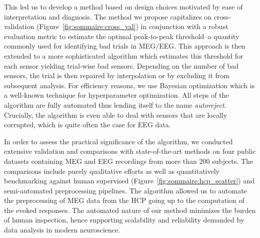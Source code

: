 This led us to develop a method based on design choices motivated by ease of interpretation and diagnosis. The method we propose capitalizes on cross-validation (Figure~\ref{fig:sommaire:cross_val}) in conjunction with a robust evaluation metric to estimate the optimal peak-to-peak threshold--a quantity commonly used for identifying bad trials in \ac{MEG}/\ac{EEG}. This approach is then extended to a more sophisticated algorithm which estimates this threshold for each sensor yielding trial-wise bad sensors. Depending on the number of bad sensors, the trial is then repaired by interpolation or by excluding it from subsequent analysis. For efficiency reasons, we use Bayesian optimization which is a well-known technique for hyperparameter optimization. All steps of the algorithm are fully automated thus lending itself to the name \emph{autoreject}. Crucially, the algorithm is even able to deal with sensors that are locally corrupted, which is quite often the case for \ac{EEG} data.

In order to assess the practical significance of the algorithm, we conducted extensive validation and comparisons with state-of-the-art methods on four public datasets containing \ac{MEG} and \ac{EEG} recordings from more than 200 subjects. The comparisons include purely qualitative efforts as well as quantitatively benchmarking against human supervised (Figure~\ref{fig:sommaire:hcp_scatter}) and semi-automated preprocessing pipelines. The algorithm allowed us to automate the preprocessing of \ac{MEG} data from the \ac{HCP} going up to the computation of the evoked responses. The automated nature of our method minimizes the burden of human inspection, hence supporting scalability and reliability demanded by data analysis in modern neuroscience.


